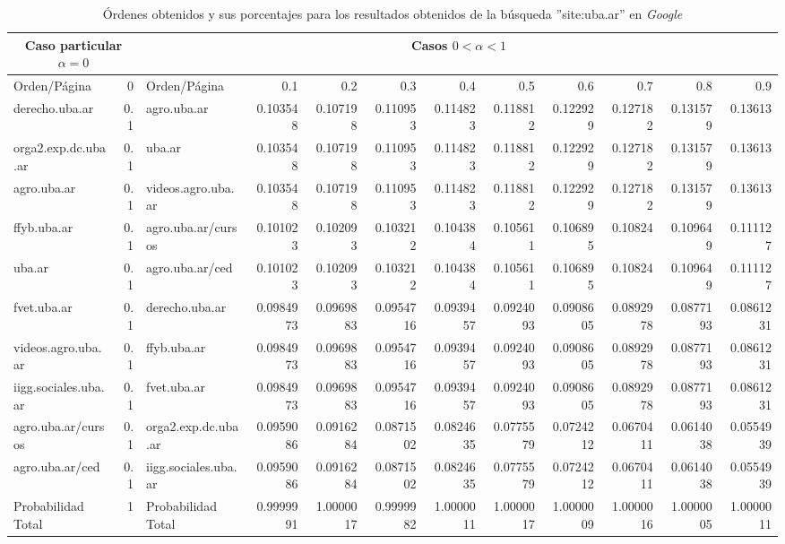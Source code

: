 \begin{table}[hb]
    \centering
    \caption{\'Ordenes obtenidos y sus porcentajes para los resultados obtenidos
        de la b\'usqueda ''site:uba.ar'' en \emph{Google}}
    \label{tbl:orden_segun_c}
    \setlength{\tabcolsep}{3pt}
    \begin{tabular}{|l||r||l||r|r|r|r|r|r|r|r|r|}
        \hline
        \multicolumn{2}{|c||}{Caso particular $\alpha = 0$}&
        \multicolumn{10}{c|}{Casos $0 < \alpha < 1$}\\
        \hline
        Orden/P\'agina & 0 & Orden/P\'agina & 0.1&0.2&0.3&0.4&0.5&0.6&0.7&0.8&0.9\\
        \hline\hline
        derecho.uba.ar& 0.1& 
        agro.uba.ar& 0.103548& 0.107198 & 0.110953 & 0.114823 & 0.118812 &
        0.122929 & 0.127182 & 0.131579 & 0.13613\\
        orga2.exp.dc.uba.ar& 0.1&
        uba.ar& 0.103548& 0.107198 & 0.110953 & 0.114823
        & 0.118812 & 0.122929 & 0.127182 & 0.131579 & 0.13613\\
        agro.uba.ar& 0.1&
        videos.agro.uba.ar& 0.103548& 0.107198 & 0.110953 & 0.114823 & 0.118812
        & 0.122929 & 0.127182 & 0.131579 & 0.13613\\
        ffyb.uba.ar& 0.1&
        agro.uba.ar/cursos& 0.101023& 0.102093 & 0.103212 & 0.104384
        & 0.105611 & 0.106895 & 0.10824& 0.109649 & 0.111127\\
        uba.ar& 0.1&
        agro.uba.ar/ced& 0.101023& 0.102093 & 0.103212 & 0.104384
        & 0.105611 & 0.106895 & 0.10824& 0.109649 & 0.111127\\
        fvet.uba.ar& 0.1&
        derecho.uba.ar& 0.0984973& 0.0969883& 0.0954716& 0.0939457&
        0.0924093& 0.0908605& 0.0892978& 0.0877193& 0.0861231\\
        videos.agro.uba.ar& 0.1&
        ffyb.uba.ar& 0.0984973& 0.0969883& 0.0954716& 0.0939457
        & 0.0924093& 0.0908605& 0.0892978& 0.0877193& 0.0861231\\
        iigg.sociales.uba.ar& 0.1&
        fvet.uba.ar& 0.0984973& 0.0969883& 0.0954716& 0.0939457
        & 0.0924093& 0.0908605& 0.0892978& 0.0877193& 0.0861231\\
        agro.uba.ar/cursos& 0.1&
        orga2.exp.dc.uba.ar& 0.0959086& 0.0916284& 0.0871502& 0.0824635& 0.0775579&
        0.0724212& 0.0670411& 0.0614038& 0.0554939\\
        agro.uba.ar/ced& 0.1&
        iigg.sociales.uba.ar& 0.0959086& 0.0916284& 0.0871502& 0.0824635
        & 0.0775579& 0.0724212& 0.0670411& 0.0614038& 0.0554939\\
        \hline\hline
        Probabilidad Total& 1&
        Probabilidad Total& 0.9999991& 1.0000017& 0.9999982& 1.0000011&
        1.0000017& 1.0000009& 1.0000016& 1.0000005& 1.0000011\\
        \hline
    \end{tabular}
\end{table}

